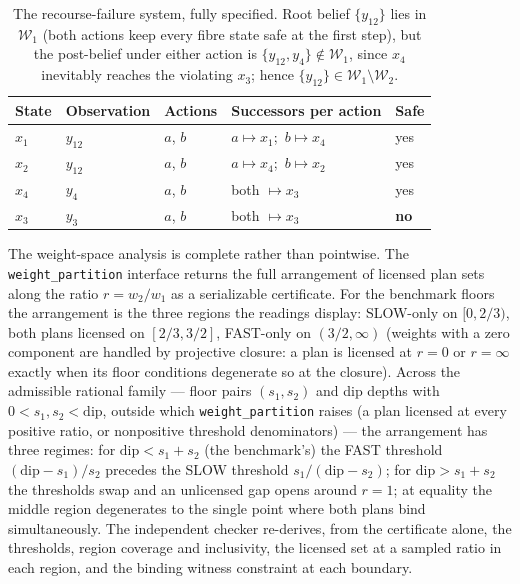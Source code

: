 \documentclass[3p,11pt]{elsarticle}
\begin{document}
\begin{table}[t]
\centering\small
\begin{tabular}{@{}lllll@{}}
\toprule
State & Observation & Actions & Successors per action & Safe \\
\midrule
$x_1$ & $y_{12}$ & $a$, $b$ & $a \mapsto x_1$;\ $b \mapsto x_4$ & yes \\
$x_2$ & $y_{12}$ & $a$, $b$ & $a \mapsto x_4$;\ $b \mapsto x_2$ & yes \\
$x_4$ & $y_4$ & $a$, $b$ & both $\mapsto x_3$ & yes \\
$x_3$ & $y_3$ & $a$, $b$ & both $\mapsto x_3$ & \textbf{no} \\
\bottomrule
\end{tabular}
\caption{The recourse-failure system, fully specified. Root belief
$\{y_{12}\}$ lies in $\mathcal{W}_1$ (both actions keep every fibre
state safe at the first step), but the post-belief under either action is
$\{y_{12}, y_4\} \notin \mathcal{W}_1$, since $x_4$ inevitably reaches
the violating $x_3$; hence
$\{y_{12}\} \in \mathcal{W}_1 \setminus \mathcal{W}_2$.}
\label{tab:recourse}
\end{table}

The weight-space analysis is complete rather than pointwise. The
\texttt{weight\_partition} interface returns the full arrangement of
licensed plan sets along the ratio $r = w_2/w_1$ as a serializable
certificate. For the benchmark floors the arrangement is the three regions
the readings display: SLOW-only on $[0, 2/3)$, both plans licensed on
$[2/3, 3/2]$, FAST-only on $(3/2, \infty)$ (weights with a zero
component are handled by projective closure: a plan is licensed at
$r = 0$ or $r = \infty$ exactly when its floor conditions degenerate so
at the closure). Across the admissible rational family --- floor pairs
$(s_1, s_2)$ and dip depths with $0 < s_1, s_2 < \mathrm{dip}$, outside
which \texttt{weight\_partition} raises (a plan licensed at every
positive ratio, or nonpositive threshold denominators) --- the arrangement
has three regimes:
for $\mathrm{dip} < s_1 + s_2$ (the benchmark's) the FAST threshold
$(\mathrm{dip} - s_1)/s_2$ precedes the SLOW threshold
$s_1/(\mathrm{dip} - s_2)$; for $\mathrm{dip} > s_1 + s_2$ the thresholds
swap and an unlicensed gap opens around $r = 1$; at equality the middle
region degenerates to the single point where both plans bind
simultaneously. The independent checker re-derives, from the certificate
alone, the thresholds, region coverage and inclusivity, the licensed set at
a sampled ratio in each region, and the binding witness constraint at each
boundary.
\end{document}
